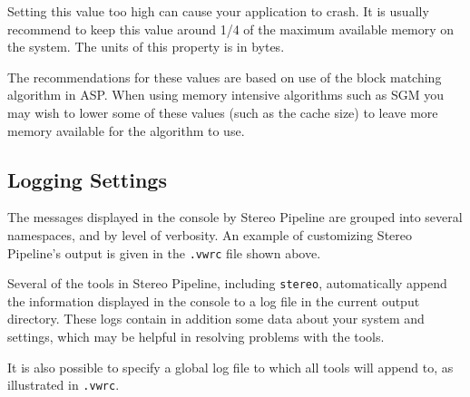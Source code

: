 \begin{description}
Setting this value too high can cause your application to crash. It is
usually recommend to keep this value around 1/4 of the maximum
available memory on the system. The units of this property is in
bytes.

The recommendations for these values are based on use of the block
matching algorithm in ASP.  When using memory intensive algorithms
such as SGM you may wish to lower some of these values (such as
the cache size) to leave more memory available for the algorithm to use.

\end{description}

\subsection{Logging Settings}
\label{logging}

The messages displayed in the console by Stereo Pipeline are grouped
into several namespaces, and by level of verbosity. An example of
customizing Stereo Pipeline's output is given in the \texttt{.vwrc} file
shown above.

Several of the tools in Stereo Pipeline, including \texttt{stereo},
automatically append the information displayed in the console to a log
file in the current output directory. These logs contain in addition some
data about your system and settings, which may be helpful in resolving
problems with the tools.

It is also possible to specify a global log file to which all tools will
append to, as illustrated in \texttt{.vwrc}.
